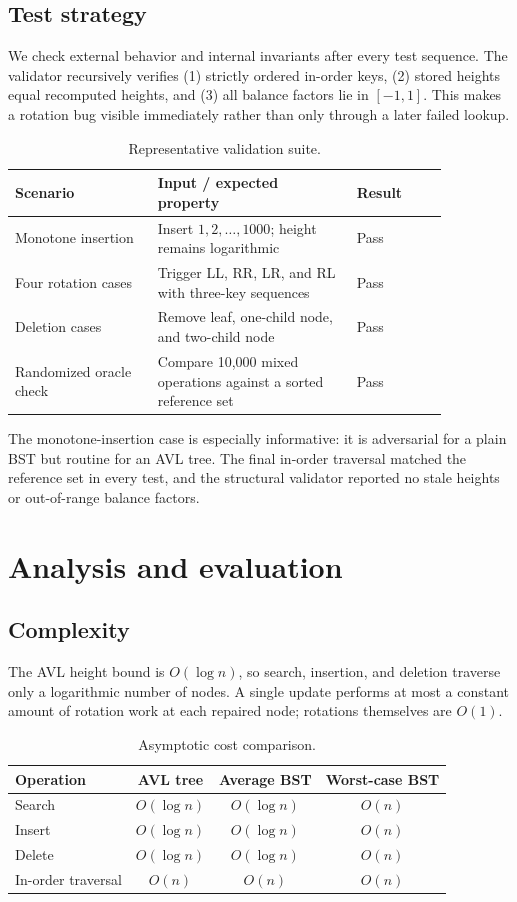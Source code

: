 \documentclass[lang=cn,a4paper,newtx,bibend=biber]{elegantpaper}
\begin{document}
\subsection{Test strategy}
We check external behavior and internal invariants after every test sequence. The validator recursively verifies (1) strictly ordered in-order keys, (2) stored heights equal recomputed heights, and (3) all balance factors lie in $[-1,1]$. This makes a rotation bug visible immediately rather than only through a later failed lookup.

\begin{table}[H]
\centering
\caption{Representative validation suite.}
\label{tab:tests}
\begin{tabular}{@{}p{0.29\linewidth}p{0.39\linewidth}p{0.18\linewidth}@{}}
\toprule
Scenario & Input / expected property & Result \\
\midrule
Monotone insertion & Insert $1,2,\ldots,1000$; height remains logarithmic & Pass \\
Four rotation cases & Trigger LL, RR, LR, and RL with three-key sequences & Pass \\
Deletion cases & Remove leaf, one-child node, and two-child node & Pass \\
Randomized oracle check & Compare 10,000 mixed operations against a sorted reference set & Pass \\
\bottomrule
\end{tabular}
\end{table}

The monotone-insertion case is especially informative: it is adversarial for a plain BST but routine for an AVL tree. The final in-order traversal matched the reference set in every test, and the structural validator reported no stale heights or out-of-range balance factors.

\section{Analysis and evaluation}
\subsection{Complexity}
The AVL height bound is $O(\log n)$, so search, insertion, and deletion traverse only a logarithmic number of nodes. A single update performs at most a constant amount of rotation work at each repaired node; rotations themselves are $O(1)$.

\begin{table}[H]
\centering
\caption{Asymptotic cost comparison.}
\label{tab:complexity}
\begin{tabular}{@{}lccc@{}}
\toprule
Operation & AVL tree & Average BST & Worst-case BST \\
\midrule
Search & $O(\log n)$ & $O(\log n)$ & $O(n)$ \\
Insert & $O(\log n)$ & $O(\log n)$ & $O(n)$ \\
Delete & $O(\log n)$ & $O(\log n)$ & $O(n)$ \\
In-order traversal & $O(n)$ & $O(n)$ & $O(n)$ \\
\bottomrule
\end{tabular}
\end{table}
\end{document}
